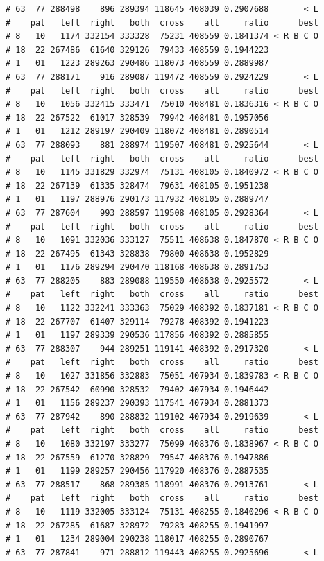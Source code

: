 \documentclass{article}\usepackage[]{graphicx}\usepackage[]{color}
\makeatletter
\newenvironment{kframe}{%
 \def\at@end@of@kframe{}%
 \ifinner\ifhmode%
  \def\at@end@of@kframe{\end{minipage}}%
  \begin{minipage}{\columnwidth}%
 \fi\fi%
 \def\FrameCommand##1{\hskip\@totalleftmargin \hskip-\fboxsep
 \colorbox{shadecolor}{##1}\hskip-\fboxsep
     \hskip-\linewidth \hskip-\@totalleftmargin \hskip\columnwidth}%
 \MakeFramed {\advance\hsize-\width
   \@totalleftmargin\z@ \linewidth\hsize
   \@setminipage}}%
 {\par\unskip\endMakeFramed%
 \at@end@of@kframe}
\newenvironment{knitrout}{}{} %
\makeatother
\begin{document}
\begin{knitrout}
\begin{kframe}
\begin{verbatim}
# 63  77 288498    896 289394 118645 408039 0.2907688       < L
#    pat   left  right   both  cross    all     ratio      best
# 8   10   1174 332154 333328  75231 408559 0.1841374 < R B C O
# 18  22 267486  61640 329126  79433 408559 0.1944223          
# 1   01   1223 289263 290486 118073 408559 0.2889987          
# 63  77 288171    916 289087 119472 408559 0.2924229       < L
#    pat   left  right   both  cross    all     ratio      best
# 8   10   1056 332415 333471  75010 408481 0.1836316 < R B C O
# 18  22 267522  61017 328539  79942 408481 0.1957056          
# 1   01   1212 289197 290409 118072 408481 0.2890514          
# 63  77 288093    881 288974 119507 408481 0.2925644       < L
#    pat   left  right   both  cross    all     ratio      best
# 8   10   1145 331829 332974  75131 408105 0.1840972 < R B C O
# 18  22 267139  61335 328474  79631 408105 0.1951238          
# 1   01   1197 288976 290173 117932 408105 0.2889747          
# 63  77 287604    993 288597 119508 408105 0.2928364       < L
#    pat   left  right   both  cross    all     ratio      best
# 8   10   1091 332036 333127  75511 408638 0.1847870 < R B C O
# 18  22 267495  61343 328838  79800 408638 0.1952829          
# 1   01   1176 289294 290470 118168 408638 0.2891753          
# 63  77 288205    883 289088 119550 408638 0.2925572       < L
#    pat   left  right   both  cross    all     ratio      best
# 8   10   1122 332241 333363  75029 408392 0.1837181 < R B C O
# 18  22 267707  61407 329114  79278 408392 0.1941223          
# 1   01   1197 289339 290536 117856 408392 0.2885855          
# 63  77 288307    944 289251 119141 408392 0.2917320       < L
#    pat   left  right   both  cross    all     ratio      best
# 8   10   1027 331856 332883  75051 407934 0.1839783 < R B C O
# 18  22 267542  60990 328532  79402 407934 0.1946442          
# 1   01   1156 289237 290393 117541 407934 0.2881373          
# 63  77 287942    890 288832 119102 407934 0.2919639       < L
#    pat   left  right   both  cross    all     ratio      best
# 8   10   1080 332197 333277  75099 408376 0.1838967 < R B C O
# 18  22 267559  61270 328829  79547 408376 0.1947886          
# 1   01   1199 289257 290456 117920 408376 0.2887535          
# 63  77 288517    868 289385 118991 408376 0.2913761       < L
#    pat   left  right   both  cross    all     ratio      best
# 8   10   1119 332005 333124  75131 408255 0.1840296 < R B C O
# 18  22 267285  61687 328972  79283 408255 0.1941997          
# 1   01   1234 289004 290238 118017 408255 0.2890767          
# 63  77 287841    971 288812 119443 408255 0.2925696       < L

\end{verbatim}
\end{kframe}
\end{knitrout}
\end{document}
